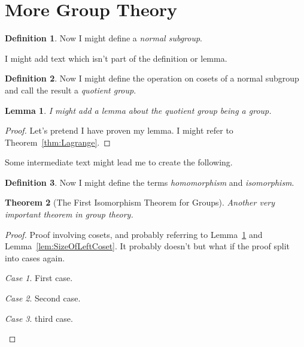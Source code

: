 \documentclass[a4paper,11pt]{article}
\theoremstyle{plain} %
\newtheorem{thm}{Theorem}[section]
\newtheorem{lem}[thm]{Lemma}
\theoremstyle{definition} %
\newtheorem{defn}{Definition}[section]
\theoremstyle{remark} %
\newtheorem{case}{Case}
\begin{document}
\section{More Group Theory}

\begin{defn}
	Now I might define a \emph{normal subgroup}.
\end{defn}

I might add text which isn't part of the definition or lemma.
\begin{defn}
	Now I might define the operation on cosets of a normal subgroup and call the result a \emph{quotient group}.
\end{defn}

\begin{lem}\label{lem:quotientgroup}
	I might add a lemma about the quotient group being a group.
\end{lem}

\begin{proof}
	Let's pretend I have proven my lemma. I might refer to Theorem~\ref{thm:Lagrange}.
\end{proof}

Some intermediate text might lead me to create the following.

\begin{defn}
	Now I might define the terms  \emph{homomorphism} and \emph{isomorphism}.
\end{defn}

\begin{thm}[The First Isomorphism Theorem for Groups] \label{thm:1stIsomorphismThm}
	Another very important theorem in group theory.
\end{thm}

\begin{proof}
	Proof involving cosets, and probably referring to Lemma~\ref{lem:quotientgroup} and Lemma~\ref{lem:SizeOfLeftCoset}.
	It probably doesn't but what if the proof  split into cases again.
	\setcounter{case}{0} %
	\begin{case}
		First case.
	\end{case}
	\begin{case}
		Second case.
	\end{case}
	\begin{case}
		third case.
	\end{case}
\end{proof}
\end{document}
